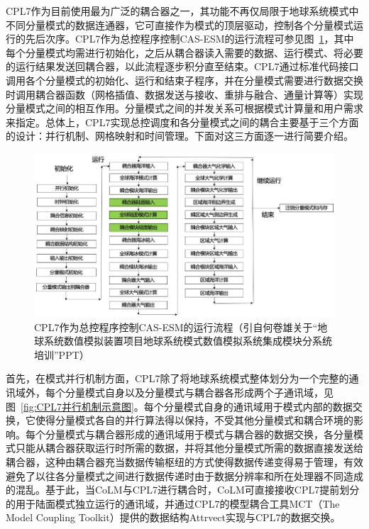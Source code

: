 CPL7作为目前使用最为广泛的耦合器之一，其功能不再仅局限于地球系统模式中不同分量模式的数据连通器，它可直接作为模式的顶层驱动，控制各个分量模式运行的先后次序。CPL7作为总控程序控制CAS-ESM的运行流程可参见图~\ref{fig:CAS-ESM的运行流程}，其中每个分量模式均需进行初始化，之后从耦合器读入需要的数据、运行模式、将必要的运行结果发送回耦合器，以此流程逐步积分直至结束。CPL7通过标准代码接口调用各个分量模式的初始化、运行和结束子程序，并在分量模式需要进行数据交换时调用耦合器函数（网格插值、数据发送与接收、重排与融合、通量计算等）实现分量模式之间的相互作用。分量模式之间的并发关系可根据模式计算量和用户需求来指定。总体上，CPL7实现总控调度和各分量模式之间的耦合主要基于三个方面的设计：并行机制、网格映射和时间管理。下面对这三方面逐一进行简要介绍。

{
\begin{figure}[htbp]
\centering
\includegraphics{Figures/模式构架/CAS-ESM的运行流程.png}
\caption{CPL7作为总控程序控制CAS-ESM的运行流程（引自何卷雄关于“地球系统数值模拟装置项目地球系统模式数值模拟系统集成模块分系统培训”PPT）}
\label{fig:CAS-ESM的运行流程}
\end{figure}
}

首先，在模式并行机制方面，CPL7除了将地球系统模式整体划分为一个完整的通讯域外，每个分量模式自身以及分量模式与耦合器各形成两个子通讯域，见图~\ref{fig:CPL7并行机制示意图}。每个分量模式自身的通讯域用于模式内部的数据交换，它使得分量模式各自的并行算法得以保持，不受其他分量模式和耦合环境的影响。每个分量模式与耦合器形成的通讯域用于模式与耦合器的数据交换，各分量模式只能从耦合器获取运行时所需的数据，并将其他分量模式所需的数据直接发送给耦合器，这种由耦合器充当数据传输枢纽的方式使得数据传递变得易于管理，有效避免了以往各分量模式之间进行数据传递时由于数据分辨率和所在处理器不同造成的混乱。基于此，当CoLM与CPL7进行耦合时，CoLM可直接接收CPL7提前划分的用于陆面模式独立运行的通讯域，并通过CPL7的模型耦合工具MCT（The Model Coupling Toolkit）提供的数据结构Attrvect实现与CPL7的数据交换。

